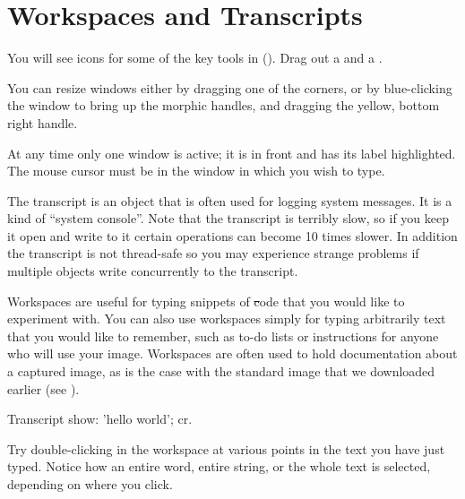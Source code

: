 \documentclass[a4paper,10pt,twoside]{book}
\begin{document}
\section{Workspaces and Transcripts}
\label{sec:transcript}

You will see icons for some of the key tools in \sq ().
Drag out a  and a .

You can resize windows either by dragging one of the corners, or by blue-clicking the window to bring up the morphic handles, and dragging the yellow, bottom right handle.

At any time only one window is active; it is in front and has its label highlighted. The mouse cursor must be in the window in which you wish to type.

The transcript is an object that is often used for logging system messages.
It is a kind of ``system console''.
Note that the transcript is terribly slow, so if you keep it open and write to it certain operations can become 10 times slower.
In addition the transcript is not thread-safe so you may experience strange problems if multiple objects write concurrently to the transcript.

Workspaces are useful for typing snippets of \st code that you would like to experiment with.
You can also use workspaces simply for typing arbitrarily text that you would like to remember, such as to-do lists or instructions for anyone who will use your image.
Workspaces are often used to hold documentation about a captured image, as is the case with the standard image that we downloaded earlier (see ).

\begin{code}{}
Transcript show: 'hello world'; cr.
\end{code}


Try double-clicking in the workspace at various points in the text you have just typed.
Notice how an entire word, entire string, or the whole text is selected, depending on where you click.
\end{document}
